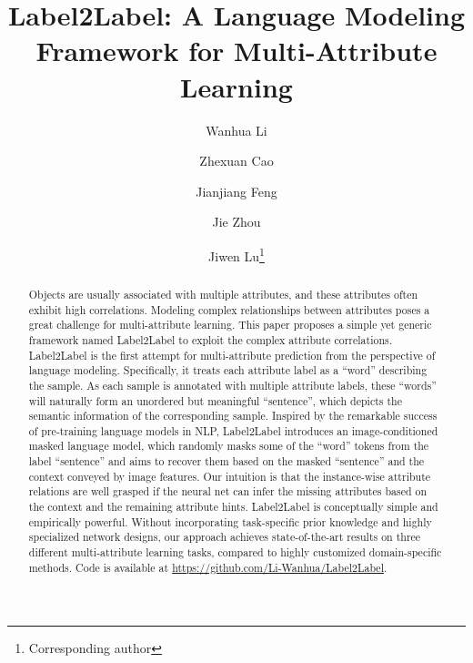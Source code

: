 \documentclass[runningheads]{llncs}
\begin{document}
\pagestyle{headings}
\mainmatter
\def\ECCVSubNumber{1175}  

\title{Label2Label: A Language Modeling Framework for Multi-Attribute Learning} 

\begin{comment}
\titlerunning{ECCV-22 submission ID \ECCVSubNumber} 
\authorrunning{ECCV-22 submission ID \ECCVSubNumber} 
\author{Anonymous ECCV submission}
\institute{Paper ID \ECCVSubNumber}
\end{comment}


\author{Wanhua Li \and
Zhexuan Cao \and
Jianjiang Feng \and
Jie Zhou \and
Jiwen Lu\thanks{Corresponding author}}
\maketitle

\begin{abstract}
  Objects are usually associated with multiple attributes, and these attributes often exhibit high correlations. Modeling complex relationships between attributes poses a great challenge for multi-attribute learning. This paper proposes a simple yet generic framework named Label2Label to exploit the complex attribute correlations. Label2Label is the first attempt for multi-attribute prediction from the perspective of language modeling.
  Specifically, it treats each attribute label as a ``word'' describing the sample. As each sample is annotated with multiple attribute labels, these ``words'' will naturally form an unordered but meaningful ``sentence'', which depicts the semantic information of the corresponding sample. Inspired by the remarkable success of pre-training language models in NLP, Label2Label introduces an image-conditioned masked language model, which randomly masks some of the ``word'' tokens from the label ``sentence'' and aims to recover them based on the masked ``sentence'' and the context conveyed by image features. Our intuition is that the instance-wise attribute relations are well grasped if the neural net can infer the missing attributes based on the context and the remaining attribute hints. Label2Label is conceptually simple and empirically powerful. Without incorporating task-specific prior knowledge and highly specialized network designs, our approach achieves state-of-the-art results on three different multi-attribute learning tasks, compared to highly customized domain-specific methods. Code is available at \url{https://github.com/Li-Wanhua/Label2Label}.
\end{abstract}
\end{document}
